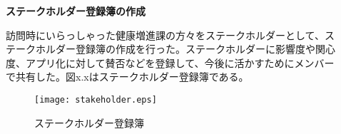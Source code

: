 ﻿\begin{description}
 \item[]
  \textbf{ステークホルダー登録簿の作成}\par
 訪問時にいらっしゃった健康増進課の方々をステークホルダーとして、ステークホルダー登録簿の作成を行った。ステークホルダーに影響度や関心度、アプリ化に対して賛否などを登録して、今後に活かすためにメンバーで共有した。図x.xはステークホルダー登録簿である。

\begin{figure}[h]
\centering
\texttt{[image: stakeholder.eps]}
\caption{ステークホルダー登録簿}
\label{fig:one}
\end{figure}
\par

  \par
\end{description}
